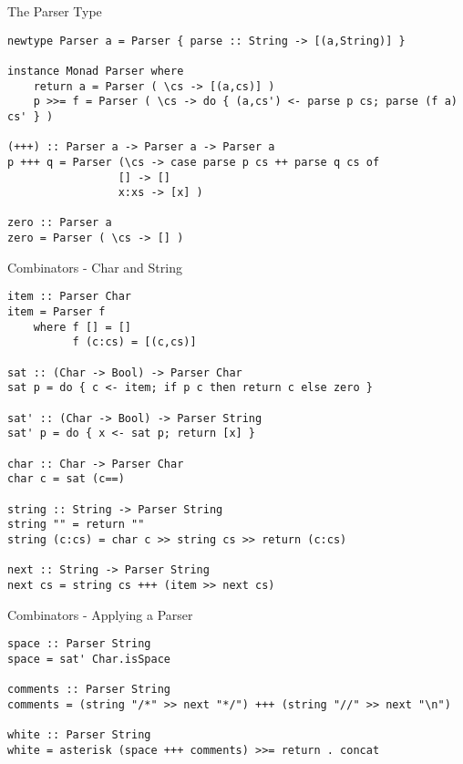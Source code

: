 \documentclass[12pt]{beamer}
\title{}
\author{}
\date{}
\newcommand{\codesize}{\fontsize{7.7}{7.7}}
\begin{document}
\begin{spacing}{1.3}

\begin{frame}[fragile=singleslide]{The Parser Type}

\begin{verbatim}
newtype Parser a = Parser { parse :: String -> [(a,String)] }

instance Monad Parser where
    return a = Parser ( \cs -> [(a,cs)] )
    p >>= f = Parser ( \cs -> do { (a,cs') <- parse p cs; parse (f a) cs' } )

(+++) :: Parser a -> Parser a -> Parser a
p +++ q = Parser (\cs -> case parse p cs ++ parse q cs of
                 [] -> []
                 x:xs -> [x] )

zero :: Parser a
zero = Parser ( \cs -> [] )
\end{verbatim}
\end{frame}

\begin{frame}[fragile=singleslide]{Combinators - Char and String}

\begin{verbatim}
item :: Parser Char
item = Parser f
    where f [] = []
          f (c:cs) = [(c,cs)]

sat :: (Char -> Bool) -> Parser Char
sat p = do { c <- item; if p c then return c else zero }

sat' :: (Char -> Bool) -> Parser String
sat' p = do { x <- sat p; return [x] }

char :: Char -> Parser Char
char c = sat (c==)

string :: String -> Parser String
string "" = return ""
string (c:cs) = char c >> string cs >> return (c:cs)

next :: String -> Parser String
next cs = string cs +++ (item >> next cs)
\end{verbatim}
\end{frame}

\begin{frame}[fragile=singleslide]{Combinators - Applying a Parser}

\begin{verbatim}
space :: Parser String
space = sat' Char.isSpace

comments :: Parser String
comments = (string "/*" >> next "*/") +++ (string "//" >> next "\n")

white :: Parser String
white = asterisk (space +++ comments) >>= return . concat


\end{verbatim}
\end{frame}
\end{spacing}
\end{document}
